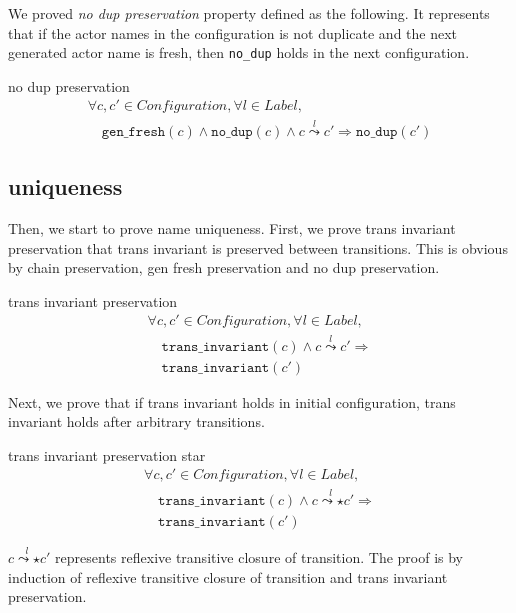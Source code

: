 We proved \textit{no dup preservation} property defined as the following.
It represents that if the actor names in the configuration is not duplicate and the next generated actor name is fresh, then \texttt{no\_dup} holds in the next configuration.

\begin{lemma}{no dup preservation}
\begin{displaymath}
  \begin{array}{l}
    \forall c, c' \in \textit{Configuration}, \forall l \in \textit{Label}, \\
    \quad \texttt{gen\_fresh}(c) \wedge \texttt{no\_dup}(c) \wedge c \overset{l}{\leadsto} c' \Rightarrow \texttt{no\_dup}(c')
  \end{array}
\end{displaymath}
\end{lemma}

\subsection{uniqueness}
Then, we start to prove name uniqueness.
First, we prove trans invariant preservation that trans invariant is preserved between transitions.
This is obvious by chain preservation, gen fresh preservation and no dup preservation.
\begin{lemma}{trans invariant preservation}
  \begin{displaymath}
    \begin{array}{l}
      \forall c, c' \in \textit{Configuration}, \forall l \in \textit{Label}, \\
      \quad \texttt{trans\_invariant}(c) \wedge c \overset{l}{\leadsto} c' \Rightarrow \\
      \quad \texttt{trans\_invariant}(c')
    \end{array}
  \end{displaymath}
\end{lemma}

Next, we prove that if trans invariant holds in initial configuration, trans invariant holds after arbitrary transitions.


\begin{lemma}{trans invariant preservation star}
  \begin{displaymath}
    \begin{array}{l}
      \forall c, c' \in \textit{Configuration}, \forall l \in \textit{Label}, \\
      \quad \texttt{trans\_invariant}(c) \wedge c \overset{l}{\leadsto\star} c' \Rightarrow \\
      \quad \texttt{trans\_invariant}(c')
    \end{array}
  \end{displaymath}
\end{lemma}
$c \overset{l}{\leadsto\star} c'$ represents reflexive transitive closure of transition.
The proof is by induction of reflexive transitive closure of transition and trans invariant preservation.

